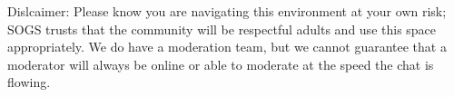 \begin{longenum}[ label*=\thesubsection.\arabic*., align=left]
\begin{longenum}[label*=\arabic*., align=left]
			\item Dislcaimer: Please know you are navigating this environment at your own risk; SOGS trusts that the community will be respectful adults and use this space appropriately. We do have a moderation team, but we cannot guarantee that a moderator will always be online or able to moderate at the speed the chat is flowing.
		\end{longenum}								
\end{longenum}















